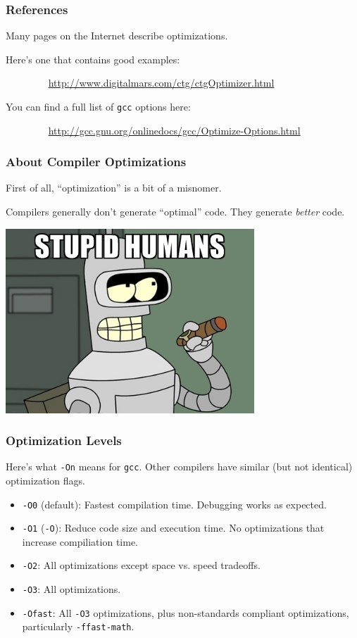 \begin{frame}
\frametitle{References}

Many pages on the Internet describe
optimizations. 

Here's one that contains good examples:

$\qquad \qquad$ \url{http://www.digitalmars.com/ctg/ctgOptimizer.html}

You can find a full list of {\tt gcc} options here:

$\qquad \qquad$ \url{http://gcc.gnu.org/onlinedocs/gcc/Optimize-Options.html}


\end{frame}

\begin{frame}
\frametitle{About Compiler Optimizations}

First of all, ``optimization'' is
a bit of a misnomer. 

Compilers generally don't generate ``optimal'' code. They generate \emph{better} code.

\begin{center}
\includegraphics[width=0.7\textwidth]{images/bender.jpg}
\end{center}


\end{frame}


\begin{frame}
\frametitle{Optimization Levels}

Here's what {\tt -On} means for
{\tt gcc}. Other compilers have similar (but not identical) optimization flags.

\begin{itemize}
\item {\tt -O0} (default): Fastest compilation time. Debugging works as expected.
\item {\tt -O1} ({\tt -O}): Reduce code size and execution time.
 No optimizations that increase compiliation time.
\item {\tt -O2}: All optimizations except space vs. speed tradeoffs.
\item {\tt -O3}: All optimizations.
\item {\tt -Ofast}: All {\tt -O3} optimizations, plus non-standards compliant optimizations,
      particularly {\tt -ffast-math}.
\end{itemize}

\end{frame}


